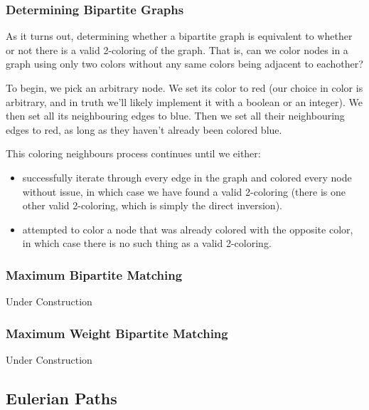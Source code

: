\subsubsection{Determining Bipartite Graphs}

As it turns out, determining whether a bipartite graph is equivalent to whether or not there is a valid 2-coloring of the graph. That is, can we color nodes in a graph using only two colors without any same colors being adjacent to eachother?

To begin, we pick an arbitrary node. We set its color to red (our choice in color is arbitrary, and in truth we'll likely implement it with a boolean or an integer). We then set all its neighbouring edges to blue. Then we set all their neighbouring edges to red, as long as they haven't already been colored blue.

This coloring neighbours process continues until we either:
\begin{itemize}
\item successfully iterate through every edge in the graph and colored every node without issue, in which case we have found a valid 2-coloring (there is one other valid 2-coloring, which is simply the direct inversion).
\item attempted to color a node that was already colored with the opposite color, in which case there is no such thing as a valid 2-coloring.
\end{itemize}

\subsubsection{Maximum Bipartite Matching}
 

Under Construction

\subsubsection{Maximum Weight Bipartite Matching}
  

Under Construction

\subsection{Eulerian Paths}
 

